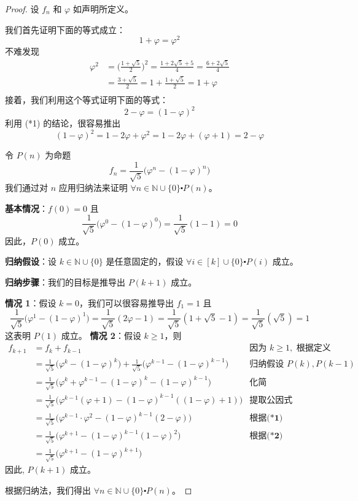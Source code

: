 \begin{proof}
    设 $f_n$ 和 $\varphi$ 如声明所定义。

    我们首先证明下面的等式成立：
    \[1+\varphi=\varphi^2 \tag{*1}\]
    不难发现
    \begin{align*}
        \varphi^2 &= \Big(\frac{1+\sqrt{5}}{2}\Big)^2 = \frac{1+2\sqrt{5}+5}{4} = \frac{6+2\sqrt{5}}{4} \\
        &= \frac{3+\sqrt{5}}{2} = 1+\frac{1+\sqrt{5}}{2} = 1+\varphi \\
    \end{align*}
    接着，我们利用这个等式证明下面的等式：
    \[2-\varphi=(1-\varphi)^2 \tag{*2}\]
    利用 (*1) 的结论，很容易推出
    \[(1-\varphi)^2 = 1-2\varphi+\varphi^2 = 1-2\varphi+(\varphi+1) = 2-\varphi\]

    令 $P(n)$ 为命题
    \[f_n = \frac{1}{\sqrt{5}}\big(\varphi^n-(1-\varphi)^n\big)\]
    我们通过对 $n$ 应用归纳法来证明 $\forall n \in \mathbb{N} \cup \{0\} \centerdot P(n)$。

    \textbf{基本情况}：$f(0) = 0$ 且
    \[\frac{1}{\sqrt{5}}\big(\varphi^0-(1-\varphi)^0\big) = \frac{1}{\sqrt{5}} (1-1) = 0\]
    因此，$P(0)$ 成立。

    \textbf{归纳假设}：设 $k \in \mathbb{N} \cup \{0\}$ 是任意固定的，假设 $\forall i \in [k] \cup \{0\} \centerdot P(i)$ 成立。

    \textbf{归纳步骤}：我们的目标是推导出 $P(k+1)$ 成立。

    \textbf{情况 1}：假设 $k=0$，我们可以很容易推导出 $f_1=1$ 且
    \[\frac{1}{\sqrt{5}}\big(\varphi^1-(1-\varphi)^1\big) = \frac{1}{\sqrt{5}} (2\varphi-1) = \frac{1}{\sqrt{5}} (1+\sqrt{5}-1) = \frac{1}{\sqrt{5}} (\sqrt{5}) = 1\]
    这表明 $P(1)$ 成立。
    \textbf{情况 2}：假设 $k \ge 1$，则
    \begin{align*}
        f_{k+1} &= f_k+f_{k-1} & \text{因为 } k \ge 1, \textbf{ 根据定义} \\
        &= \frac{1}{\sqrt{5}}\big(\varphi^k-(1-\varphi)^k\big) + \frac{1}{\sqrt{5}}\big(\varphi^{k-1}-(1-\varphi)^{k-1}\big) & \text{归纳假设 } P(k), P(k-1)\\
        &= \frac{1}{\sqrt{5}}\big(\varphi^k+\varphi^{k-1}-(1-\varphi)^k-(1-\varphi)^{k-1}\big) & \textbf{化简}\\
        &= \frac{1}{\sqrt{5}}\big(\varphi^{k-1}(\varphi+1)-(1-\varphi)^{k-1}((1-\varphi)+1)\big) & \textbf{提取公因式}\\
        &= \frac{1}{\sqrt{5}}\big(\varphi^{k-1} \cdot \varphi^2-(1-\varphi)^{k-1}(2-\varphi)\big) & \textbf{根据(*1)}\\
        &= \frac{1}{\sqrt{5}}\big(\varphi^{k+1} -(1-\varphi)^{k-1}(1-\varphi)^2\big) & \textbf{根据(*2)}\\
        &= \frac{1}{\sqrt{5}}\big(\varphi^{k+1} -(1-\varphi)^{k+1}\big) & 
    \end{align*}
    因此, $P(k+1)$ 成立。

    根据归纳法，我们得出 $\forall n \in \mathbb{N} \cup \{0\} \centerdot P(n)$。
\end{proof}

